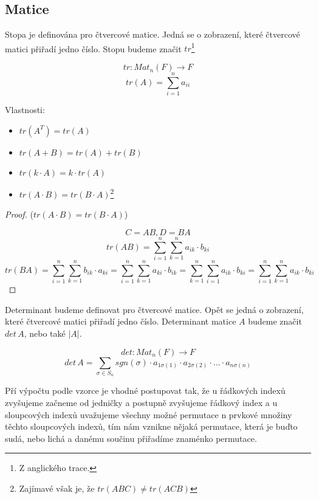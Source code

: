 \subsection{Matice}

\begin{definition}[Stopa]
    Stopa je definována pro čtvercové matice. Jedná se o zobrazení,
    které čtvercové matici přiřadí jedno číslo. Stopu budeme značit
    $tr$\footnote{Z anglického trace.}

    $$tr: Mat_n(F) \rightarrow F$$
    $$tr(A) = \sum_{i=1}^na_{ii}$$

    Vlastnosti:
    \begin{itemize}
        \item $tr(A^T) = tr(A)$
        \item $tr(A + B) = tr(A) + tr(B)$
        \item $tr(k \cdot A) = k \cdot tr(A)$
        \item $tr(A\cdot B) = tr(B \cdot A)$\footnote{Zajímavé však je, že
        $tr(ABC) \neq tr(ACB)$}
    \end{itemize}

\end{definition}
\begin{proof}
    ($tr(A\cdot B) = tr(B \cdot A)$)

    $$C = AB, D = BA$$
    $$tr(AB) = \sum_{i=1}^n\sum_{k=1}^n a_{ik} \cdot b_{ki}$$
    $$tr(BA) = \sum_{i=1}^n\sum_{k=1}^n b_{ik} \cdot a_{ki} = \sum_{i=1}^n\sum_{k=1}^n a_{ki}
    \cdot b_{ik} = \sum_{k=1}^n\sum_{i=1}^n a_{ik} \cdot b_{ki} =
    \sum_{i=1}^n\sum_{k=1}^n a_{ik} \cdot b_{ki}$$

\end{proof}

\begin{definition}[Determinant]
    \label{def:determinant}
    Determinant budeme definovat pro čtvercové matice.
    Opět se jedná o zobrazení, které čtvercové matici přiřadí
    jedno číslo. Determinant matice $A$ budeme značit $det\,A$, nebo také $|A|$.

    $$det: Mat_n(F) \rightarrow F$$
    $$det\, A = \sum_{\sigma \in S_n} sgn(\sigma) \cdot a_{1\sigma(1)} \cdot a_{2\sigma(2)}
    \cdot \ldots \cdot a_{n\sigma(n)}$$

    Pří výpočtu podle vzorce je vhodné postupovat tak, že u řádkových indexů zvyšujeme začneme
    od jedničky a postupně zvyšujeme řádkový index a u sloupcových indexů uvažujeme všechny možné
    permutace n prvkové množiny těchto sloupcových indexů, tím nám vznikne nějaká permutace, která
    je buďto sudá, nebo lichá a danému součinu přiřadíme znaménko permutace.
\end{definition}

